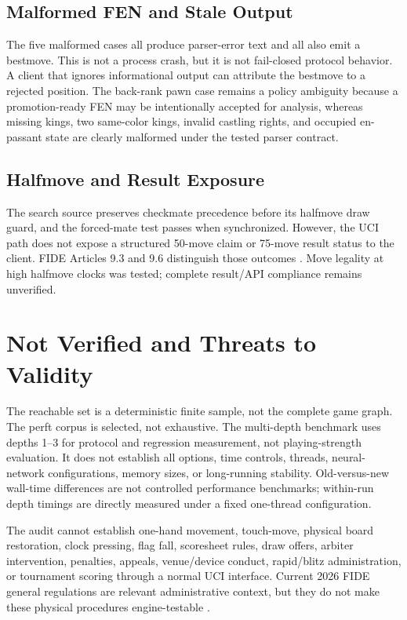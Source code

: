 \documentclass[conference]{IEEEtran}
\begin{document}
\subsection{Malformed FEN and Stale Output}
The five malformed cases all produce parser-error text and all also emit a bestmove. This is not a process crash, but it is not fail-closed protocol behavior. A client that ignores informational output can attribute the bestmove to a rejected position. The back-rank pawn case remains a policy ambiguity because a promotion-ready FEN may be intentionally accepted for analysis, whereas missing kings, two same-color kings, invalid castling rights, and occupied en-passant state are clearly malformed under the tested parser contract.

\subsection{Halfmove and Result Exposure}
The search source preserves checkmate precedence before its halfmove draw guard, and the forced-mate test passes when synchronized. However, the UCI path does not expose a structured 50-move claim or 75-move result status to the client. FIDE Articles 9.3 and 9.6 distinguish those outcomes \cite{fide}. Move legality at high halfmove clocks was tested; complete result/API compliance remains unverified.

\section{Not Verified and Threats to Validity}
The reachable set is a deterministic finite sample, not the complete game graph. The perft corpus is selected, not exhaustive. The multi-depth benchmark uses depths 1--3 for protocol and regression measurement, not playing-strength evaluation. It does not establish all options, time controls, threads, neural-network configurations, memory sizes, or long-running stability. Old-versus-new wall-time differences are not controlled performance benchmarks; within-run depth timings are directly measured under a fixed one-thread configuration.

The audit cannot establish one-hand movement, touch-move, physical board restoration, clock pressing, flag fall, scoresheet rules, draw offers, arbiter intervention, penalties, appeals, venue/device conduct, rapid/blitz administration, or tournament scoring through a normal UCI interface. Current 2026 FIDE general regulations are relevant administrative context, but they do not make these physical procedures engine-testable \cite{general}.
\end{document}
